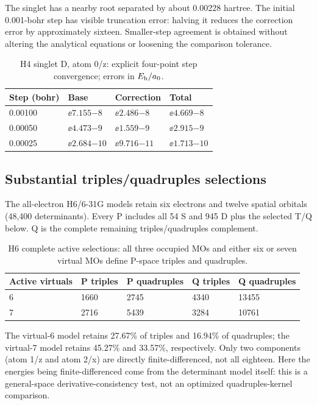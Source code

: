 The singlet has a nearby root separated by about 0.00228 hartree. The initial
0.001-bohr step has visible truncation error: halving it reduces the correction
error by approximately sixteen. Smaller-step agreement is obtained without
altering the analytical equations or loosening the comparison tolerance.

\begin{table}[htbp]\centering\small
\begin{tabular}{llll}
\toprule
Step (bohr) & Base & Correction & Total\\
\midrule
0.00100 & $\ee{7.155}{-8}$ & $\ee{2.486}{-8}$ & $\ee{4.669}{-8}$\\
0.00050 & $\ee{4.473}{-9}$ & $\ee{1.559}{-9}$ & $\ee{2.915}{-9}$\\
0.00025 & $\ee{2.684}{-10}$ & $\ee{9.716}{-11}$ & $\ee{1.713}{-10}$\\
\bottomrule
\end{tabular}
\caption{H4 singlet D, atom 0/z: explicit four-point step convergence; errors in $E_{\mathrm h}/a_0$.}\label{tab:step}
\end{table}

\subsection{Substantial triples/quadruples selections}
The all-electron H6/6-31G models retain six electrons and twelve spatial orbitals
(48,400 determinants). Every P includes all 54 S and 945 D plus the selected
T/Q below. Q is the complete remaining triples/quadruples complement.

\begin{table}[htbp]\centering\small
\begin{tabular}{lllll}
\toprule
Active virtuals & P triples & P quadruples & Q triples & Q quadruples\\
\midrule
6 & 1660 & 2745 & 4340 & 13455\\
7 & 2716 & 5439 & 3284 & 10761\\
\bottomrule
\end{tabular}
\caption{H6 complete active selections: all three occupied MOs and either six or seven virtual MOs define P-space triples and quadruples.}\label{tab:h6spaces}
\end{table}

The virtual-6 model retains 27.67\% of triples and 16.94\% of quadruples;
the virtual-7 model retains 45.27\% and 33.57\%, respectively. Only two
components (atom 1/z and atom 2/x) are directly finite-differenced, not all eighteen.
Here the energies being finite-differenced come from the determinant model itself:
this is a general-space derivative-consistency test, not an optimized quadruples-kernel comparison.

